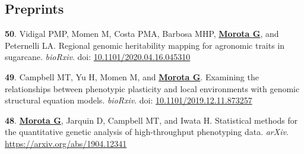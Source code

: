 \documentclass[margin,line,10pt]{res}
\newenvironment{list1}{
  \begin{list}{\ding{113}}{%
      \setlength{\itemsep}{0in}
      \setlength{\parsep}{0in} \setlength{\parskip}{0in}
      \setlength{\topsep}{0in} \setlength{\partopsep}{0in} 
      \setlength{\leftmargin}{0.17in}}}{\end{list}}
\begin{document}
\begin{resume}
\begin{comment}
 
     

        
  \item  [{\bf 29}.]  Rovadoscki GA, Pertille SFN, Moreira GCM, P{\'e}rtille F,  Botelho AA, Cesar ASM, Petrini J, Gerv{\'a}sio IC, Dauria BD, \textbf{\underline{Morota G}}, Spangler ML, Pinto LFB, de Carvalho GGP, Lanna DPD, Coutinho LL, and Mour{\~a}o GB. Estimates of genomic heritability and genome-wide association study for meat quality traits in Santa In{\^e}s sheep. \emph{animal}

  \item  [{\bf 28}.]  Mamani GCM, Santana BF, Oliveira Junior GA,  Mattos EC, Eler JP, Ventura RV, \textbf{\underline{Morota G}}, and Ferraz JBS  \emph{PLoS ONE}.     

    
    \end{list1}
\end{comment}


\vspace{0.5cm}
\section{\sc Preprints}
\begin{list1}
     
\item [{\bf 50}.] Vidigal PMP, Momen M, Costa PMA, Barbosa MHP, \textbf{\underline{Morota G}}, and Peternelli LA. Regional genomic heritability mapping for agronomic traits in sugarcane. \emph{bioRxiv}. doi: \textcolor{blue}{\href{https://doi.org/10.1101/2020.04.16.045310}{10.1101/2020.04.16.045310}}

  \vspace{0.5cm}

\item [{\bf 49}.] Campbell MT, Yu H, Momen M, and \textbf{\underline{Morota G}}. Examining the relationships between phenotypic plasticity and local environments with genomic structural equation models. \emph{bioRxiv}. doi: \textcolor{blue}{\href{https://doi.org/10.1101/2019.12.11.873257}{10.1101/2019.12.11.873257}}

    \vspace{0.5cm}
  
\item  [{\bf 48}.] \textbf{\underline{Morota G}}, Jarquin D, Campbell MT, and Iwata H. Statistical methods for the quantitative genetic analysis of high-throughput phenotyping data. \emph{arXiv}.  \textcolor{blue}{\href{https://arxiv.org/abs/1904.12341}{https://arxiv.org/abs/1904.12341}}


\end{list1}
\end{resume}
\end{document}
